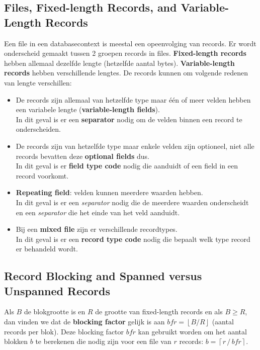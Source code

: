 \subsection{Files, Fixed-length Records, and Variable-Length Records}
Een file in een databasecontext is meestal een opeenvolging van records. Er wordt onderscheid gemaakt tussen 2 groepen records in files. \textbf{Fixed-length records} hebben allemaal dezelfde lengte (hetzelfde aantal bytes). \textbf{Variable-length records} hebben verschillende lengtes. De records kunnen om volgende redenen van lengte verschillen: 
\begin{itemize}
	\item De records zijn allemaal van hetzelfde type maar \'e\'en of meer velden hebben een variabele lengte (\textbf{variable-length fields}).\\
	In dit geval is er een \textbf{separator} nodig om de velden binnen een record te onderscheiden.

	\item De records zijn van hetzelfde type maar enkele velden zijn optioneel, niet alle records bevatten deze \textbf{optional fields} dus.\\
	In dit geval is er \textbf{field type code} nodig die aanduidt of een field in een record voorkomt.
	
	\item \textbf{Repeating field}: velden kunnen meerdere waarden hebben.\\
	In dit geval is er een \textit{separator} nodig die de meerdere waarden onderscheidt en een \textit{separator} die het einde van het veld aanduidt.
	
	\item Bij een \textbf{mixed file} zijn er verschillende recordtypes.\\
	In dit geval is er een \textbf{record type code} nodig die bepaalt welk type record er behandeld wordt.
\end{itemize}


\subsection{Record Blocking and Spanned versus Unspanned Records}
Als $B$ de blokgrootte is en $R$ de grootte van fixed-length records en als $B \geqslant R$, dan vinden we dat de \textbf{blocking factor} gelijk is aan $\textit{bfr} = \left\lfloor B/R \right\rfloor$ (aantal records per blok). Deze blocking factor $\textit{bfr}$ kan gebruikt worden om het aantal blokken $b$ te berekenen die nodig zijn voor een file van $r$ records: $b = \left\lceil r \,/\, \textit{bfr} \right\rceil$.

